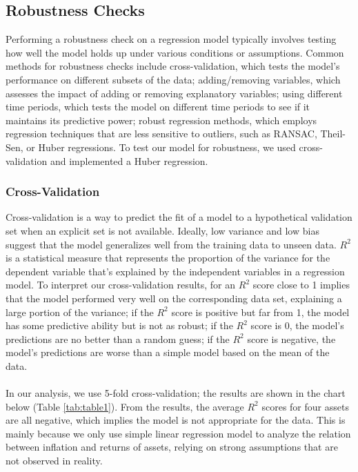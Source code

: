 \documentclass{article}
\begin{document}
\subsection{Robustness Checks}
Performing a robustness check on a regression model typically involves testing how well the model holds up under various conditions or assumptions. Common methods for robustness checks include cross-validation, which tests the model's performance on different subsets of the data; adding/removing variables, which assesses the impact of adding or removing explanatory variables; using different time periods, which tests the model on different time periods to see if it maintains its predictive power; robust regression methods, which employs regression techniques that are less sensitive to outliers, such as RANSAC, Theil-Sen, or Huber regressions. To test our model for robustness, we used cross-validation and implemented a Huber regression.

\subsubsection{Cross-Validation}
Cross-validation is a way to predict the fit of a model to a hypothetical validation set when an explicit set is not available. Ideally, low variance and low bias suggest that the model generalizes well from the training data to unseen data. \(R^2\) is a statistical measure that represents the proportion of the variance for the dependent variable that's explained by the independent variables in a regression model. To interpret our cross-validation results, for an \(R^2\) score close to 1 implies that the model performed very well on the corresponding data set, explaining a large portion of the variance; if the \(R^2\) score is positive but far from 1, the model has some predictive ability but is not as robust; if the \(R^2\) score is 0, the model's predictions are no better than a random guess; if the \(R^2\) score is negative, the model's predictions are worse than a simple model based on the mean of the data.
\\~\\
In our analysis, we use 5-fold  cross-validation; the results are shown in the chart below (Table \ref{tab:table1}). From the results, the average \(R^2\) scores for four assets are all negative, which implies the model is not appropriate for the data. This is mainly because we only use simple linear regression model to analyze the relation between inflation and returns of assets, relying on strong assumptions that are not observed in reality.
\end{document}
